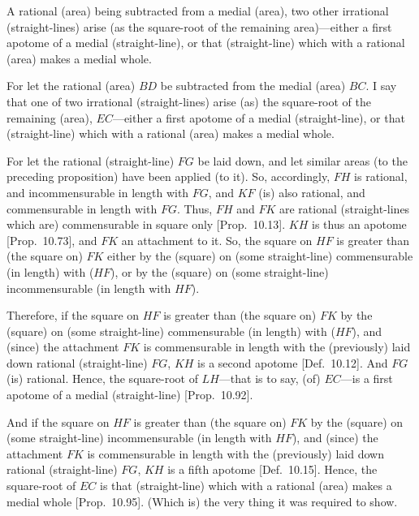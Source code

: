 \begin{Parallel}{}{}
{A rational (area) being subtracted from
a medial (area), two other irrational (straight-lines) arise (as the square-root
of the remaining area)---either a first apotome of a medial (straight-line),
or that (straight-line) which with a rational (area) makes a medial whole.

For let the rational (area) $BD$ be subtracted from the medial
(area) $BC$. I say that one of two irrational (straight-lines) arise (as) the square-root of the remaining (area), $EC$---either a first apotome of a medial
(straight-line), or that (straight-line) which with a rational (area) makes
a medial whole.

For let the rational (straight-line) $FG$ be laid down, and let
similar areas (to the preceding proposition) have  been applied (to it). So,
accordingly, $FH$ is rational, and incommensurable in length with
$FG$, and $KF$ (is) also rational, and commensurable
in length with $FG$. Thus, $FH$ and $FK$ are rational (straight-lines which
are) commensurable in square only [Prop.~10.13].
$KH$ is thus an apotome [Prop.~10.73], and $FK$ an attachment to it. So, the square on $HF$ is greater than (the square on)
$FK$ either by the (square) on (some straight-line) commensurable (in length)
with ($HF$), or by the (square) on (some straight-line) incommensurable
(in length with $HF$).

\centerline{}

Therefore, if the square on $HF$ is greater than (the square on) $FK$
by the (square) on (some straight-line) commensurable (in length) with ($HF$),
and (since) the attachment $FK$ is commensurable
in length with the (previously) laid down rational (straight-line) $FG$,
$KH$ is a second apotome [Def.~10.12]. 
And $FG$ (is) rational. Hence, the square-root of $LH$---that is to say, (of)
$EC$---is a first apotome of a medial (straight-line) [Prop.~10.92].

And if the square on $HF$ is greater than (the square on) $FK$
by the (square) on (some straight-line) incommensurable (in length with $HF$),
and (since) the attachment $FK$ is commensurable
in length with the (previously) laid down rational (straight-line) $FG$,
$KH$ is a fifth apotome [Def.~10.15]. Hence,
the square-root of $EC$ is that (straight-line) which with a rational (area)
makes a medial whole [Prop.~10.95]. 
(Which is) the very thing it was required to show.}
\end{Parallel}

